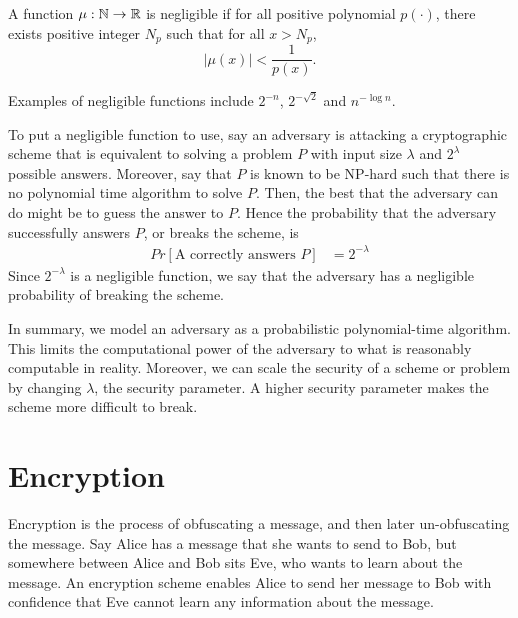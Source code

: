 \begin{definition}
\label{defn:negible}
A function $\mu : \mathbb{N} \to \mathbb{R}$ is negligible if for all positive polynomial $p(\cdot)$, there exists positive integer $N_p$ such that for all $x > N_p$, 
\begin{equation}
    |\mu(x)| < \frac{1}{p(x)}.
\end{equation}
\cite{goldreich}
\end{definition}

Examples of negligible functions include $2^{-n}$, $2^{- \sqrt{2}}$ and $n^{- \log n}$. 

To put a negligible function to use, say an adversary is attacking a cryptographic scheme that is equivalent to solving a problem $P$ with input size $\lambda$ and $2^{\lambda}$ possible answers. 
Moreover, say that $P$ is known to be NP-hard such that there is no polynomial time algorithm to solve $P$. 
Then, the best that the adversary can do might be to guess the answer to $P$.
Hence the probability that the adversary successfully answers $P$, or breaks the scheme, is 
\begin{align*}
Pr[\text{A correctly answers $P$}] & = {2^{- \lambda}}
\end{align*}
Since $2^{- \lambda}$ is a negligible function, we say that the adversary has a negligible probability of breaking the scheme. 

In summary, we model an adversary as a probabilistic polynomial-time algorithm. 
This limits the computational power of the adversary to what is reasonably computable in reality. 
Moreover, we can scale the security of a scheme or problem by changing $\lambda$, the security parameter. 
A higher security parameter makes the scheme more difficult to break. 

\section{Encryption}

Encryption is the process of obfuscating a message, and then later un-obfuscating the message.
Say Alice has a message that she wants to send to Bob, but somewhere between Alice and Bob sits Eve, who wants to learn about the message.
An encryption scheme enables Alice to send her message to Bob with confidence that Eve cannot learn any information about the message. 

